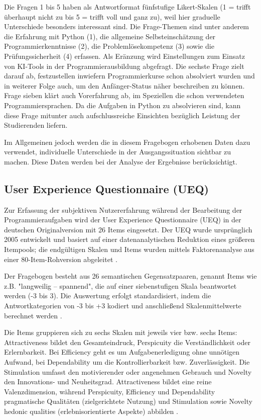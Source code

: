 Die Fragen 1 bis 5 haben als Antwortformat fünfstufige Likert-Skalen (1 = trifft überhaupt nicht zu bis 5 = trifft voll und ganz zu), weil hier graduelle Unterschiede besonders interessant sind. Die Frage-Themen sind unter anderem die Erfahrung mit Python (1), die allgemeine Selbsteinschätzung der Programmierkenntnisse (2), die Problemlösekompetenz (3) sowie die Prüfungssicherheit (4) erfassen. Als Eränzung wird Einstellungen zum Einsatz von KI-Tools in der Programmierausbildung abgefragt. Die sechste Frage zielt darauf ab, festzustellen inwiefern Programmierkurse schon absolviert wurden und in weiterer Folge auch, um den Anfänger-Status näher beschreiben zu können. Frage sieben klärt auch Vorerfahrung ab, im Speziellen die schon verwendeten Programmiersprachen. Da die Aufgaben in Python zu absolvieren sind, kann diese Frage mitunter auch aufschlussreiche Einsichten bezüglich Leistung der Studierenden liefern.

Im Allgemeinen jedoch werden die in diesem Fragebogen erhobenen Daten dazu verwendet, individuelle Unterschiede in der Ausgangssituation sichtbar zu machen. Diese Daten werden bei der Analyse der Ergebnisse berücksichtigt.

\subsection{User Experience Questionnaire (UEQ)}\label{cha:ueq}
Zur Erfassung der subjektiven Nutzererfahrung während der Bearbeitung der Programmieraufgaben wird der User Experience Questionnaire (UEQ) in der deutschen Originalversion mit 26 Items eingesetzt. Der UEQ wurde ursprünglich 2005 entwickelt und basiert auf einer datenanalytischen Reduktion eines größeren Itempools; die endgültigen Skalen und Items wurden mittels Faktorenanalyse aus einer 80-Item-Rohversion abgeleitet \parencite[S.~384-386]{SchreppUEQ2014}.

Der Fragebogen besteht aus 26 semantischen Gegensatzpaaren, genannt Items wie z.B. "langweilig -- spannend", die auf einer siebenstufigen Skala beantwortet werden (-3 bis 3). Die Auswertung erfolgt standardisiert, indem die Antwortkategorien von -3 bis +3 kodiert und anschließend Skalenmittelwerte berechnet werden \parencite[S.~2]{Schrepp2023UEQHandbook}.

Die Items gruppieren sich zu sechs Skalen mit jeweils vier bzw. sechs Items: Attractiveness bildet den Gesamteindruck, Perspicuity die Verständlichkeit oder Erlernbarkeit. Bei Efficiency geht es um Aufgabenerledigung ohne unnötigen Aufwand, bei Dependability um die Kontrollierbarkeit bzw. Zuverlässigkeit. Die Stimulation umfasst den motivierender oder angenehmen Gebrauch und Novelty den Innovations- und Neuheitsgrad. Attractiveness bildet eine reine Valenzdimension, während Perspicuity, Efficiency und Dependability pragmatische Qualitäten (zielgerichtete Nutzung) und Stimulation sowie Novelty hedonic qualities (erlebnisorientierte Aspekte) abbilden \parencite[S.~2-3]{Schrepp2023UEQHandbook}.

